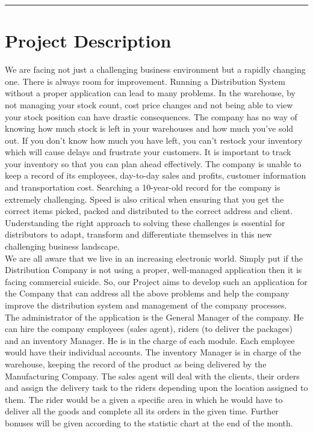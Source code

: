 \documentclass[12pt]{article}
\newcommand{\Rule}{\rule{\linewidth}{0.5pt}}
\begin{document}
	\Rule
\tableofcontents
\section{Project Description}
We are facing not just a challenging business environment but a rapidly changing one. There is always room for improvement. Running a Distribution System without a proper application can lead to many problems. In the warehouse, by not managing your stock count, cost price changes and not being able to view your stock position can have drastic consequences. The company has no way of knowing how much stock is left in your warehouses and how much you’ve sold out. If you don’t know how much you have left, you can’t restock your inventory which will cause delays and frustrate your customers. It is important to track your inventory so that you can plan ahead effectively. The company is unable to keep a record of its employees, day-to-day sales and profits, customer information and transportation cost. Searching a 10-year-old record for the company is extremely challenging. Speed is also critical when ensuring that you get the correct items picked, packed and distributed to the correct address and client. Understanding the right approach to solving these challenges is essential for distributors to adapt, transform and differentiate themselves in this new challenging business landscape.  \\
We are all aware that we live in an increasing electronic world. Simply put if the Distribution Company is not using a proper, well-managed application then it is facing commercial suicide. So, our Project aims to develop such an application for the Company that can address all the above problems and help the company improve the distribution system and management of the company processes. \\
The administrator of the application is the General Manager of the company. He can hire the company employees (sales agent), riders (to deliver the packages) and an inventory Manager. He is in the charge of each module. Each employee would have their individual accounts. The inventory Manager is in charge of the warehouse, keeping the record of the product as being delivered by the Manufacturing Company. The sales agent will deal with the clients, their orders and assign the delivery task to the riders depending upon the location assigned to them. The rider would be a given a specific area in which he would have to deliver all the goods and complete all its orders in the given time. Further bonuses will be given according to the statistic chart at the end of the month. \\
\end{document}
